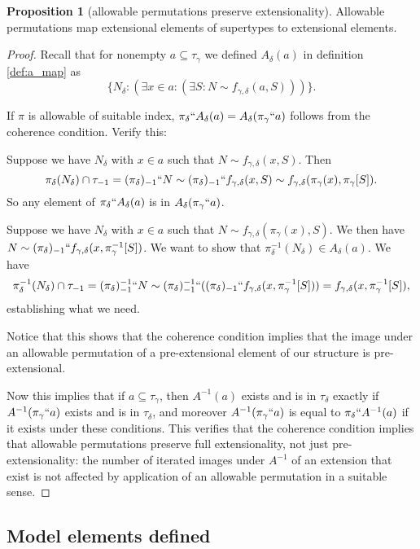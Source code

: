 \documentclass{article}
\theoremstyle{definition}
\newtheorem{proposition}[theorem]{Proposition}
\theoremstyle{remark}
\begin{document}
\begin{proposition}[allowable permutations preserve extensionality]\label{prop:allowable_preserves_extensionality}
Allowable permutations map extensional elements of supertypes to extensional elements.
\end{proposition}
\begin{proof}
{Recall that} for nonempty  $a\subseteq\tau_\gamma$ we defined $A_\delta(a)$ {in definition \ref{def:a_map}} as $$\{N_\delta:(\exists x \in a:(\exists S:N \sim f_{\gamma,\delta}(a,S)))\}.$$

If $\pi$ is allowable of suitable index, $\pi_\delta``A_\delta(a)= A_\delta(\pi_\gamma``a)$ follows from the coherence condition.  Verify this:

Suppose we have $N_\delta$ with $x \in a$ such that $N \sim f_{\gamma,\delta}(x,S)$.  Then $$\pi_\delta(N_\delta)  \cap \tau_{-1} = (\pi_\delta)_{-1}``N \sim (\pi_\delta)_{-1}``f_{\gamma,\delta}(x,S) \sim f_{\gamma,\delta}(\pi_\gamma(x),\pi_\gamma[S]).$$  So any element of $\pi_\delta``A_\delta(a)$ is in $A_\delta(\pi_\gamma``a)$.

Suppose we have $N_\delta$ with $x \in a$ such that $N \sim f_{\gamma,\delta}(\pi_\gamma(x),S)$.  We then have $N \sim (\pi_\delta)_{-1}``f_{\gamma,\delta}(x,\pi_\gamma^{-1}[S])$.  We want to show that $\pi_\delta^{-1}(N_\delta) \in A_\delta(a)$.  We have $$\pi_\delta^{-1}(N_\delta) \cap \tau_{-1} = (\pi_\delta)_{-1}^{-1}``N \sim
(\pi_\delta)_{-1}^{-1}``((\pi_\delta)_{-1}``f_{\gamma,\delta}(x,\pi_\gamma^{-1}[S])) = f_{\gamma,\delta}(x,\pi_\gamma^{-1}[S]),$$ establishing what we need.

Notice that this shows that the coherence condition implies that the image under an allowable permutation of a pre-extensional element of our structure is pre-extensional.

Now this implies that if $a \subseteq \tau_\gamma$, then $A^{-1}(a)$ exists and is in $\tau_\delta$ exactly if $A^{-1}(\pi_\gamma``a)$ exists and is in $\tau_\delta$, and moreover $A^{-1}(\pi_\gamma``a)$ is equal to $\pi_\delta``A^{-1}(a)$ if it exists under these conditions.  This verifies that the coherence condition implies that allowable permutations preserve full extensionality, not just pre-extensionality:  the number of iterated images under $A^{-1}$ of an extension that exist is not affected by application of an allowable permutation in a suitable sense.
\end{proof}

\subsection{Model elements defined}\label{ss:model_elements}
\end{document}
